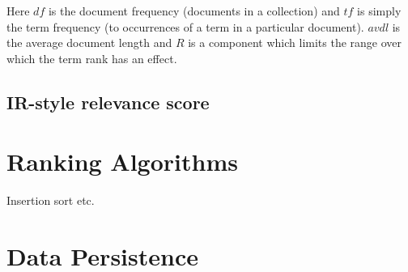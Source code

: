 Here $df$ is the document frequency (documents in a collection) and $tf$ is simply the term frequency (to occurrences of a term in a particular document). $avdl$ is the average document length and $R$ is a component which limits the range over which the term rank has an effect. 

\subsection{IR-style relevance score}

\section{Ranking Algorithms}

Insertion sort etc.

\section{Data Persistence}

